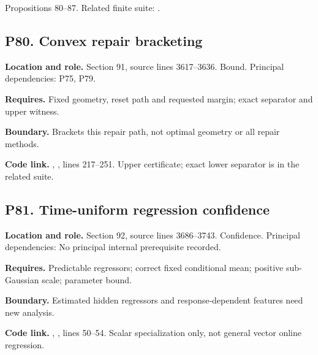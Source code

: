 \documentclass[11pt,oneside,openany]{book}
\numberwithin{equation}{section}
\begin{document}
Propositions 80--87. Related finite suite:
.

\par\noindent\begin{minipage}{\textwidth}
\subsection{P80. Convex repair
bracketing}\label{LSMRegister:p80.-convex-repair-bracketing}

\textbf{Location and role.} Section 91, source lines 3617--3636. Bound.
Principal dependencies: P75, P79.

\textbf{Requires.} Fixed geometry, reset path and requested margin;
exact separator and upper witness.

\textbf{Boundary.} Brackets this repair path, not optimal geometry or
all repair methods.

\textbf{Code link.} ,
, lines 217--251. Upper certificate; exact
lower separator is in the related suite.
\end{minipage}\par\medskip

\par\noindent\begin{minipage}{\textwidth}
\subsection{P81. Time-uniform regression
confidence}\label{LSMRegister:p81.-time-uniform-regression-confidence}

\textbf{Location and role.} Section 92, source lines 3686--3743.
Confidence. Principal dependencies: No principal internal prerequisite
recorded.

\textbf{Requires.} Predictable regressors; correct fixed conditional
mean; positive sub-Gaussian scale; parameter bound.

\textbf{Boundary.} Estimated hidden regressors and response-dependent
features need new analysis.

\textbf{Code link.} ,
, lines 50--54. Scalar specialization only, not general
vector online regression.
\end{minipage}\par\medskip
\end{document}
